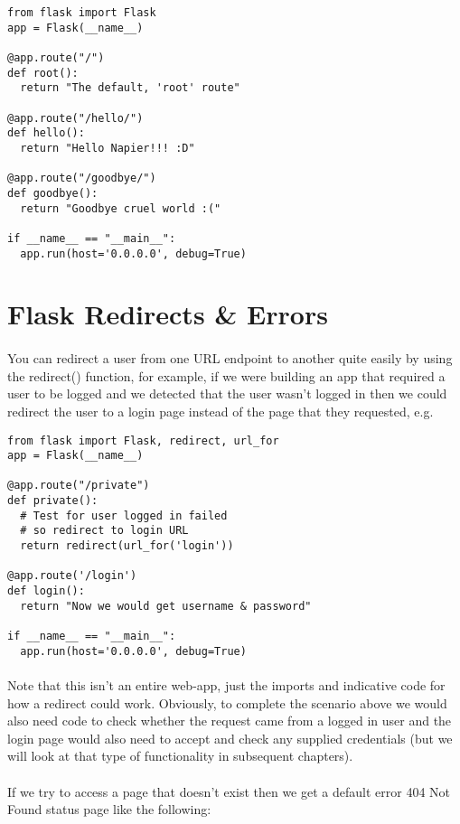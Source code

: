 \documentclass[12pt, a4paper, twoside]{book}
\begin{document}
\begin{lstlisting}
from flask import Flask
app = Flask(__name__)

@app.route("/")
def root():
  return "The default, 'root' route"

@app.route("/hello/")
def hello():
  return "Hello Napier!!! :D"

@app.route("/goodbye/")
def goodbye():
  return "Goodbye cruel world :("

if __name__ == "__main__":
  app.run(host='0.0.0.0', debug=True)
\end{lstlisting}

\section{Flask Redirects \& Errors}
\label{errors}
\paragraph{} You can redirect a user from one URL endpoint to another quite easily by using the redirect() function, for example, if we were building an app that required a user to be logged and we detected that the user wasn't logged in then we could redirect the user to a login page instead of the page that they requested, e.g.

\begin{lstlisting}
from flask import Flask, redirect, url_for
app = Flask(__name__)

@app.route("/private")
def private():
  # Test for user logged in failed
  # so redirect to login URL
  return redirect(url_for('login'))

@app.route('/login')
def login():
  return "Now we would get username & password"

if __name__ == "__main__":
  app.run(host='0.0.0.0', debug=True)
\end{lstlisting}
\paragraph{} Note that this isn't an entire web-app, just the imports and indicative code for how a redirect could work. Obviously, to complete the scenario above we would also need code to check whether the request came from a logged in user and the login page would also need to accept and check any supplied credentials (but we will look at that type of functionality in subsequent chapters). 

\paragraph{} If we try to access a page that doesn't exist then we get a default error 404 Not Found status page like the following:
\end{document}
